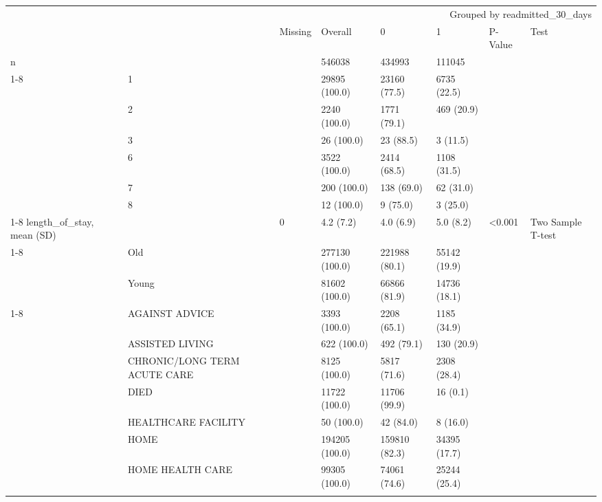 \begin{tabular}{llllllll}
\toprule
 &  & \multicolumn{6}{r}{Grouped by readmitted_30_days} \\
 &  & Missing & Overall & 0 & 1 & P-Value & Test \\
\midrule
n &  &  & 546038 & 434993 & 111045 &  &  \\
\cline{1-8}
\multirow[t]{7}{*}{cci_score, n (%
 & 1 &  & 29895 (100.0) & 23160 (77.5) & 6735 (22.5) &  &  \\
 & 2 &  & 2240 (100.0) & 1771 (79.1) & 469 (20.9) &  &  \\
 & 3 &  & 26 (100.0) & 23 (88.5) & 3 (11.5) &  &  \\
 & 6 &  & 3522 (100.0) & 2414 (68.5) & 1108 (31.5) &  &  \\
 & 7 &  & 200 (100.0) & 138 (69.0) & 62 (31.0) &  &  \\
 & 8 &  & 12 (100.0) & 9 (75.0) & 3 (25.0) &  &  \\
\cline{1-8}
length_of_stay, mean (SD) &  & 0 & 4.2 (7.2) & 4.0 (6.9) & 5.0 (8.2) & <0.001 & Two Sample T-test \\
\cline{1-8}
\multirow[t]{3}{*}{age_group, n (%
 & Old &  & 277130 (100.0) & 221988 (80.1) & 55142 (19.9) &  &  \\
 & Young &  & 81602 (100.0) & 66866 (81.9) & 14736 (18.1) &  &  \\
\cline{1-8}
\multirow[t]{14}{*}{discharge_disposition, n (%
 & AGAINST ADVICE &  & 3393 (100.0) & 2208 (65.1) & 1185 (34.9) &  &  \\
 & ASSISTED LIVING &  & 622 (100.0) & 492 (79.1) & 130 (20.9) &  &  \\
 & CHRONIC/LONG TERM ACUTE CARE &  & 8125 (100.0) & 5817 (71.6) & 2308 (28.4) &  &  \\
 & DIED &  & 11722 (100.0) & 11706 (99.9) & 16 (0.1) &  &  \\
 & HEALTHCARE FACILITY &  & 50 (100.0) & 42 (84.0) & 8 (16.0) &  &  \\
 & HOME &  & 194205 (100.0) & 159810 (82.3) & 34395 (17.7) &  &  \\
 & HOME HEALTH CARE &  & 99305 (100.0) & 74061 (74.6) & 25244 (25.4) &  &  \\
}}}
\end{tabular}
